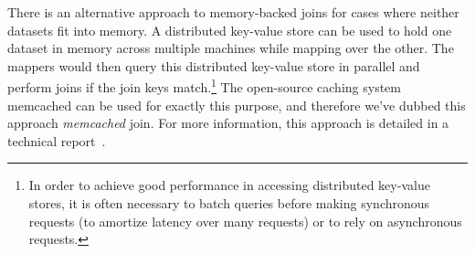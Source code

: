 There is an alternative approach to memory-backed joins for cases
where neither datasets fit into memory.  A distributed key-value store
can be used to hold one dataset in memory across multiple machines
while mapping over the other.  The mappers would then query this
distributed key-value store in parallel and perform joins if the join
keys match.\footnote{In order to achieve good performance in accessing
  distributed key-value stores, it is often necessary to batch queries
  before making synchronous requests (to amortize latency over many
  requests) or to rely on asynchronous requests.}  The open-source
caching system memcached can be used for exactly this purpose, and
therefore we've dubbed this approach \emph{memcached} join.  For more
information, this approach is detailed in a technical
report~\cite{Lin_etal_TR2009}.

